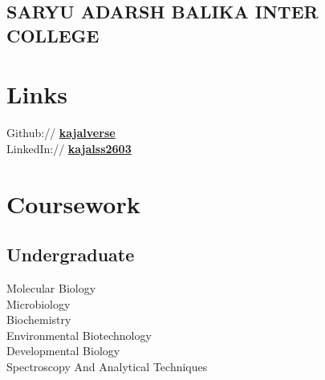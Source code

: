 \documentclass[]{kajalverse-resume}
\begin{document}
\begin{minipage}[t]{0.33\textwidth}
\subsection{SARYU ADARSH BALIKA INTER COLLEGE}
\sectionsep


\section{Links} 
Github:// \href{https://github.com/kajalverse}{\bf kajalverse} \\
LinkedIn:// \href{https://www.linkedin.com/in/kajalss2603}{\bf kajalss2603} \\
\sectionsep


\section{Coursework}
\subsection{}
\subsection{Undergraduate} 
Molecular Biology \\
Microbiology \\
Biochemistry \\
Environmental Biotechnology \\
Developmental Biology\\
Spectroscopy And Analytical Techniques \
%
%

\end{minipage}
\hfill
\end{document}
